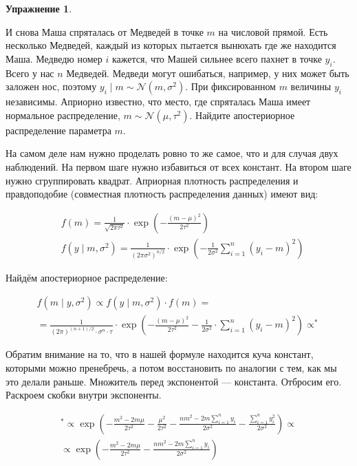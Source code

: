 \documentclass[12pt, a4paper, oneside]{extreport}
\def \mN{\mathcal{N}}
\newcommand{\expp}[1]{ \exp \left( #1 \right)}
\theoremstyle{plain}              %
\theoremstyle{definition}         %
\newtheorem{problem}{\color{myblue} Упражнение}
\begin{document}
\begin{problem}\label{norm_upr}
	
И снова Маша спряталась от Медведей в точке $m$ на числовой прямой. Есть несколько Медведей, каждый из которых пытается вынюхать где же находится Маша. Медведю номер $i$ кажется, что Машей сильнее всего пахнет в точке $y_i$. Всего у нас $n$ Медведей. Медведи могут ошибаться, например, у них может быть заложен нос, поэтому $y_i \mid m \sim \mN( m, \sigma^2)$. При фиксированном $m$ величины $y_i$ независимы. Априорно известно, что место, где спряталась Маша имеет нормальное распределение, $m \sim \mN(\mu, \tau^2)$. Найдите апостериорное распределение параметра $m$.
	
\begin{sol}

На самом деле нам нужно проделать ровно то же самое, что и для случая двух наблюдений. На первом шаге нужно избавиться от всех констант. На втором шаге нужно сгруппировать квадрат. Априорная плотность распределения и правдоподобие (совместная плотность распределения данных) имеют вид:

\begin{equation*}
\begin{aligned}
&f(m) = \frac{1}{\sqrt{2\pi \tau^2}} \cdot \expp{-\frac{(m - \mu)^2}{2\tau^2}} \\
&f(y \mid m, \sigma^2) = \frac{1}{(2 \pi \sigma^2)^{n/2}} \cdot \expp{-\frac{1}{2\sigma^2} \sum_{i=1}^n (y_i - m)^2}
\end{aligned}
\end{equation*}

Найдём апостериорное распределение:

\begin{multline*}
f(m \mid y, \sigma^2) \propto f(y \mid m, \sigma^2) \cdot f(m) = \\ = \frac{1}{(2\pi)^{(n+1)/2} \cdot \sigma^n \cdot \tau} \cdot \expp{-\frac{(m - \mu)^2}{2 \tau^2} - \frac{1}{2 \sigma^2} \cdot \sum_{i=1}^n (y_i - m)^2} \propto ^{*} 
\end{multline*}

Обратим внимание на то, что в нашей формуле находится куча констант, которыми можно пренебречь, а потом восстановить по аналогии с тем, как мы это делали раньше. Множитель перед экспонентой --- константа. Отбросим его. Раскроем скобки внутри экспоненты.

\begin{multline*}
^{*} \propto \expp{-\frac{m^2 - 2m \mu}{2 \tau^2} - \frac{\mu^2}{2\tau^2} - \frac{n m^2 - 2m \sum_{i=1}^n y_i}{2\sigma^2} - \frac{\sum_{i=1}^{n} y_i^2}{2\sigma^2}} \propto \\ \propto \expp{-\frac{m^2 - 2m \mu}{2 \tau^2} - \frac{n m^2 - 2m \sum_{i=1}^n y_i}{2\sigma^2} }
\end{multline*}


\end{sol}
\end{problem}
\end{document}
